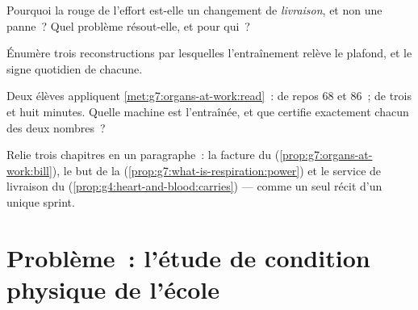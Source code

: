 \begin{exercise}[$\star\star$]\label{exo:g7:organs-at-work:9}
Pourquoi la  rouge de l'effort est-elle un changement de
\emph{livraison}, et non une panne~? Quel problème résout-elle, et
pour qui~?
\end{exercise}

\begin{exercise}[$\star\star$]\label{exo:g7:organs-at-work:10}
Énumère trois reconstructions par lesquelles l'entraînement relève
le plafond, et le signe quotidien de chacune.
\end{exercise}

\begin{exercise}[$\star\star$]\label{exo:g7:organs-at-work:11}
Deux élèves appliquent \cref{met:g7:organs-at-work:read}~:  de
repos $68$ et $86$~;  de trois et huit minutes. Quelle
machine est l'entraînée, et que certifie exactement chacun des deux
nombres~?
\end{exercise}

\begin{exercise}[$\star\star\star$]\label{exo:g7:organs-at-work:12}
Relie trois chapitres en un paragraphe~: la facture du 
(\cref{prop:g7:organs-at-work:bill}), le but de la 
(\cref{prop:g7:what-is-respiration:power}) et le service de
livraison du 
(\cref{prop:g4:heart-and-blood:carries}) --- comme un seul récit
d'un unique sprint.
\end{exercise}

\section{Problème~: l'étude de condition physique de l'école}

